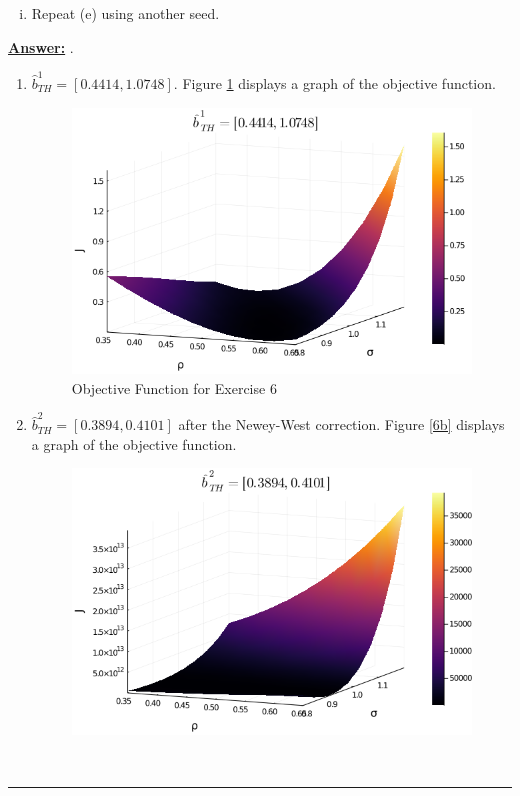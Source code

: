 \documentclass{article} %
\theoremstyle{definition}
\newenvironment{solution}[1][Answer]{\begin{singlespace}\underline{\textbf{#1:}}\quad }{\ \rule{0.3em}{0.3em}\end{singlespace}} %
\begin{document}
\begin{enumerate}
\begin{enumerate}[i.]
			\item Repeat (e) using another seed.
		\end{enumerate}
		\begin{solution}
		.
		\begin{enumerate}[label=(\alph*)]
			\item $\hat{b}_{TH}^{1}=[0.4414,1.0748]$. Figure \ref{6a} displays a graph of the objective function.
			\begin{figure}[htbp] 
				\centering
				\includegraphics[scale=.5]{Figures/Exercise6.png}
				\caption{Objective Function for Exercise 6 \label{6a}}
			\end{figure}
			\item $\hat{b}_{TH}^{2}=[0.3894,0.4101]$ after the Newey-West correction. Figure \ref{6b} displays a graph of the objective function.
			\begin{figure}[htbp] 
				\centering
				\includegraphics[scale=.5]{Figures/Exercise6NeweyWestCorrection.png}

\end{figure}
\end{enumerate}
\end{solution}
\end{enumerate}
\end{document}
